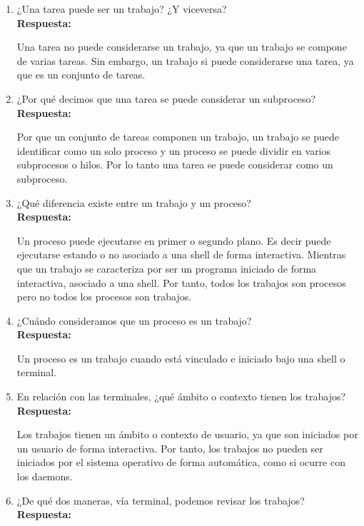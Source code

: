 \documentclass[a4paper,12pt]{article}
\begin{document}
\begin{enumerate}[label=\textbf{Pregunta \arabic*.}]
    \item ¿Una tarea puede ser un trabajo? ¿Y viceversa? \\ %
    \textbf{Respuesta:} 


    Una tarea no puede considerarse un trabajo, ya que un trabajo se compone de varias tareas. Sin embargo, un trabajo si puede considerarse una tarea, ya que es un conjunto de tareas.
    

    \item ¿Por qué decimos que una tarea se puede considerar un subproceso? \\
    \textbf{Respuesta:} 
    
    Por que un conjunto de tareas componen un trabajo, un trabajo se puede identificar como un solo proceso y un proceso se puede dividir en varios subprocesos o hilos. Por lo tanto una tarea se puede considerar como un subproceso.


    \item ¿Qué diferencia existe entre un trabajo y un proceso? \\
    \textbf{Respuesta:} 
    
    Un proceso puede ejecutarse en primer o segundo plano. Es decir puede ejecutarse estando o no asociado a una shell de forma interactiva. Mientras que un trabajo se caracteriza por ser un programa iniciado de forma interactiva, asociado a una shell. Por tanto, todos los trabajos son procesos pero no todos los procesos son trabajos.


    \item ¿Cuándo consideramos que un proceso es un trabajo? \\
    \textbf{Respuesta:} 
    
    Un proceso es un trabajo cuando está vinculado e iniciado bajo una shell o terminal. 


    \item En relación con las terminales, ¿qué ámbito o contexto tienen los trabajos? \\ %
    \textbf{Respuesta:} 

    Los trabajos tienen un ámbito o contexto de usuario, ya que son iniciados por un usuario de forma interactiva. Por tanto, los trabajos no pueden ser iniciados por el sistema operativo de forma automática, como si ocurre con los daemons.
    

    \item ¿De qué dos maneras, vía terminal, podemos revisar los trabajos? \\
    \textbf{Respuesta:} 
    

\end{enumerate}
\end{document}
